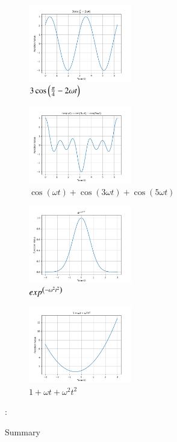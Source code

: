\documentclass[journal,12pt,twocolumn]{IEEEtran}
\theoremstyle{remark}
\begin{document}
\begin{figure}[h!]
    \centering
    \includegraphics[width=0.4\textwidth]{figs/a1_fig3.png}
    \caption{$3\cos\left(\frac{\pi}{4}- 2\omega t\right)$}
\end{figure}
\begin{figure}[h!]
    \centering
    \includegraphics[width=0.4\textwidth]{figs/a1_fig4.png}
    \caption{$\cos(\omega t)+\cos(3\omega t)+\cos(5\omega t)$}
\end{figure}
\begin{figure}[h!]
    \centering
    \includegraphics[width=0.4\textwidth]{figs/a1_fig5.png}
    \caption{$exp^{\left(-\omega^2 t^2\right)}$}
\end{figure}
\begin{figure}[h!]
    \centering
    \includegraphics[width=0.4\textwidth]{figs/a1_fig6.png}
    \caption{$1+\omega t+\omega^2 t^2$}
\end{figure}
\newpage
\begin{flushleft}
  \begin{table}[h]
   \def\arraystretch{1.5}:
   \caption{Summary}
   \label{tab:table.11.14-4}
   
  \end{table}
 \end{flushleft}
\end{document}
